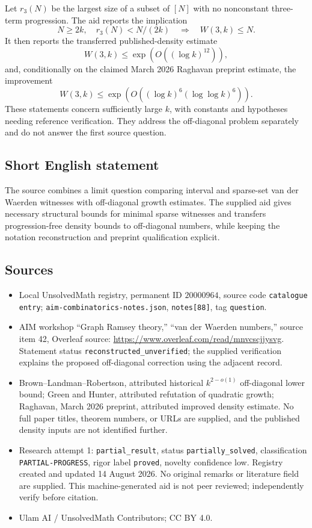 \documentclass[11pt]{article}
\begin{document}
Let \(r_3(N)\) be the largest size of a subset of \([N]\) with no nonconstant three-term progression. The aid reports the implication
\[
 N\ge2k,\quad r_3(N)<N/(2k)
 \quad\Longrightarrow\quad W(3,k)\le N.
\]
It then reports the transferred published-density estimate
\[
 W(3,k)\le\exp(O((\log k)^{12})),
\]
and, conditionally on the claimed March 2026 Raghavan preprint estimate, the improvement
\[
 W(3,k)\le\exp(O((\log k)^6(\log\log k)^6)).
\]
These statements concern sufficiently large \(k\), with constants and hypotheses needing reference verification. They address the off-diagonal problem separately and do not answer the first source question.
\subsection{Short English statement}
The source combines a limit question comparing interval and sparse-set van der Waerden witnesses with off-diagonal growth estimates. The supplied aid gives necessary structural bounds for minimal sparse witnesses and transfers progression-free density bounds to off-diagonal numbers, while keeping the notation reconstruction and preprint qualification explicit.
\subsection{Sources}
\begin{itemize}
\item Local UnsolvedMath registry, permanent ID \(20000964\), source code \texttt{catalogue entry}; \texttt{aim-combinatorics-notes.json}, \texttt{notes[88]}, tag \texttt{question}.
\item AIM workshop ``Graph Ramsey theory,'' ``van der Waerden numbers,'' source item 42, Overleaf source: \url{https://www.overleaf.com/read/mnvcscjjysvg}. Statement status \texttt{reconstructed\_unverified}; the supplied verification explains the proposed off-diagonal correction using the adjacent record.
\item Brown--Landman--Robertson, attributed historical \(k^{2-o(1)}\) off-diagonal lower bound; Green and Hunter, attributed refutation of quadratic growth; Raghavan, March 2026 preprint, attributed improved density estimate. No full paper titles, theorem numbers, or URLs are supplied, and the published density inputs are not identified further.
\item Research attempt 1: \texttt{partial\_result}, status \texttt{partially\_solved}, classification \texttt{PARTIAL-PROGRESS}, rigor label \texttt{proved}, novelty confidence low. Registry created and updated 14 August 2026. No original remarks or literature field are supplied. This machine-generated aid is not peer reviewed; independently verify before citation.
\item Ulam AI / UnsolvedMath Contributors; CC BY 4.0.
\end{itemize}
\end{document}
